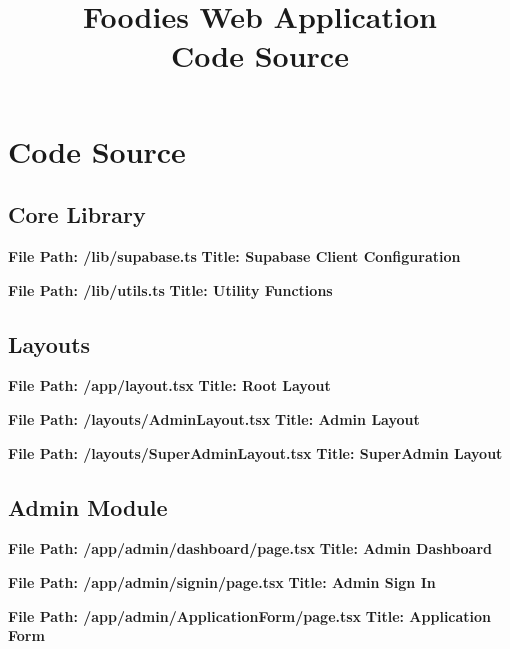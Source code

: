 \documentclass[12pt,a4paper]{book}
\title{\textbf{Foodies Web Application} \\ Code Source}
\author{}
\date{}
\begin{document}
\maketitle

\chapter{Code Source}

\section{Core Library}

\noindent\textbf{File Path: /lib/supabase.ts}
\noindent\textbf{Title: Supabase Client Configuration}


\noindent\textbf{File Path: /lib/utils.ts}
\noindent\textbf{Title: Utility Functions}


\section{Layouts}

\noindent\textbf{File Path: /app/layout.tsx}
\noindent\textbf{Title: Root Layout}


\noindent\textbf{File Path: /layouts/AdminLayout.tsx}
\noindent\textbf{Title: Admin Layout}


\noindent\textbf{File Path: /layouts/SuperAdminLayout.tsx}
\noindent\textbf{Title: SuperAdmin Layout}


\section{Admin Module}

\noindent\textbf{File Path: /app/admin/dashboard/page.tsx}
\noindent\textbf{Title: Admin Dashboard}


\noindent\textbf{File Path: /app/admin/signin/page.tsx}
\noindent\textbf{Title: Admin Sign In}


\noindent\textbf{File Path: /app/admin/ApplicationForm/page.tsx}
\noindent\textbf{Title: Application Form}

\end{document}
